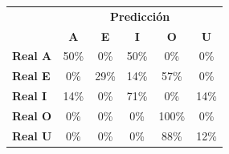 \begin{tabular}{lccccc}
\toprule
 & \multicolumn{5}{c}{\textbf{Predicción}} \\
 & \textbf{A} & \textbf{E} & \textbf{I} & \textbf{O} & \textbf{U} \\
\midrule
\textbf{Real A} & \cellcolor[rgb]{0.65,0.65,1.00} \color{white} 50\% & \cellcolor[rgb]{1.00,1.00,1.00}  0\% & \cellcolor[rgb]{0.65,0.65,1.00} \color{white} 50\% & \cellcolor[rgb]{1.00,1.00,1.00}  0\% & \cellcolor[rgb]{1.00,1.00,1.00}  0\% \\
\textbf{Real E} & \cellcolor[rgb]{1.00,1.00,1.00}  0\% & \cellcolor[rgb]{0.80,0.80,1.00}  29\% & \cellcolor[rgb]{0.90,0.90,1.00}  14\% & \cellcolor[rgb]{0.60,0.60,1.00} \color{white} 57\% & \cellcolor[rgb]{1.00,1.00,1.00}  0\% \\
\textbf{Real I} & \cellcolor[rgb]{0.90,0.90,1.00}  14\% & \cellcolor[rgb]{1.00,1.00,1.00}  0\% & \cellcolor[rgb]{0.50,0.50,1.00} \color{white} 71\% & \cellcolor[rgb]{1.00,1.00,1.00}  0\% & \cellcolor[rgb]{0.90,0.90,1.00}  14\% \\
\textbf{Real O} & \cellcolor[rgb]{1.00,1.00,1.00}  0\% & \cellcolor[rgb]{1.00,1.00,1.00}  0\% & \cellcolor[rgb]{1.00,1.00,1.00}  0\% & \cellcolor[rgb]{0.30,0.30,1.00} \color{white} 100\% & \cellcolor[rgb]{1.00,1.00,1.00}  0\% \\
\textbf{Real U} & \cellcolor[rgb]{1.00,1.00,1.00}  0\% & \cellcolor[rgb]{1.00,1.00,1.00}  0\% & \cellcolor[rgb]{1.00,1.00,1.00}  0\% & \cellcolor[rgb]{0.39,0.39,1.00} \color{white} 88\% & \cellcolor[rgb]{0.91,0.91,1.00}  12\% \\
\bottomrule
\end{tabular}